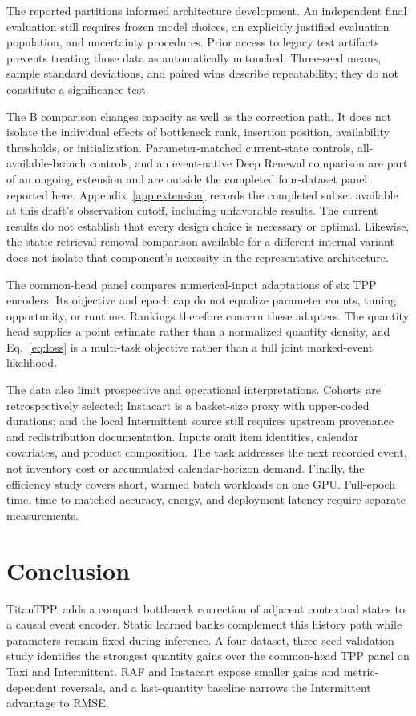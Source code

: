 \documentclass[runningheads]{llncs}
\newcommand{\method}{TitanTPP}
\begin{document}
The reported partitions informed architecture development. An independent
final evaluation still requires frozen model choices, an explicitly justified
evaluation population, and uncertainty procedures. Prior access to legacy
test artifacts prevents treating those data as automatically untouched.
Three-seed means, sample standard deviations, and paired wins describe
repeatability; they do not constitute a significance test.

The B comparison changes capacity as well as the correction path. It does
not isolate the individual effects of bottleneck rank, insertion position,
availability thresholds, or initialization. Parameter-matched current-state
controls, all-available-branch controls, and an event-native Deep Renewal
comparison are part of an ongoing extension and are outside the completed
four-dataset panel reported here. Appendix~\ref{app:extension} records the
completed subset available at this draft's observation cutoff, including
unfavorable results. The current results do not establish that
every design choice is necessary or optimal. Likewise, the static-retrieval
removal comparison available for a different internal variant does not
isolate that component's necessity in the representative architecture.

The common-head panel compares numerical-input adaptations of six TPP
encoders. Its objective and epoch cap do not equalize parameter counts,
tuning opportunity, or runtime. Rankings therefore concern these adapters.
The quantity head supplies a point estimate rather than a normalized quantity
density, and Eq.~\eqref{eq:loss} is a multi-task objective rather than a full
joint marked-event likelihood.

The data also limit prospective and operational interpretations. Cohorts are
retrospectively selected; Instacart is a basket-size proxy with upper-coded
durations; and the local Intermittent source still requires upstream
provenance and redistribution documentation. Inputs omit item identities,
calendar covariates, and product composition. The task addresses the next
recorded event, not inventory cost or accumulated calendar-horizon demand.
Finally, the efficiency study covers short, warmed batch workloads on one
GPU. Full-epoch time, time to matched accuracy, energy, and deployment
latency require separate measurements.

\section{Conclusion}
\method\ adds a compact bottleneck correction of adjacent contextual states
to a causal event encoder. Static learned banks complement this history
path while parameters remain fixed during inference. A four-dataset,
three-seed validation study identifies the strongest quantity gains over
the common-head TPP panel on Taxi and Intermittent. RAF and Instacart expose
smaller gains and metric-dependent reversals, and a last-quantity baseline
narrows the Intermittent advantage to RMSE.
\end{document}
